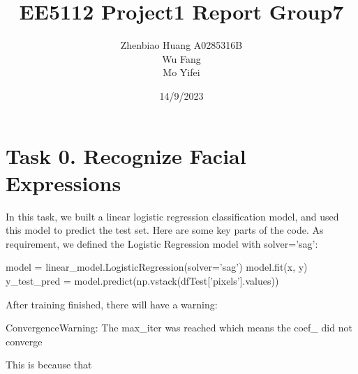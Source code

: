 \documentclass{article}
\title{EE5112 Project1 Report Group7}
\author{Zhenbiao Huang A0285316B \\ Wu Fang \\ Mo Yifei}
\date{14/9/2023}
\begin{document}
 
\maketitle
\makeatother

\tableofcontents

\clearpage
\section{Task 0. Recognize Facial Expressions}
In this task, we built a linear logistic regression classification model, and used this model to predict the test set.
Here are some key parts of the code. As requirement, we defined the Logistic Regression model with solver='sag':
\begin{python}
model = linear_model.LogisticRegression(solver='sag')
model.fit(x, y)
y_test_pred = model.predict(np.vstack(dfTest['pixels'].values))
\end{python}
After training finished, there will have a warning:
\begin{python}
ConvergenceWarning: The max_iter was reached which means the coef_ did not converge
\end{python}
This is because that 
\end{document}
